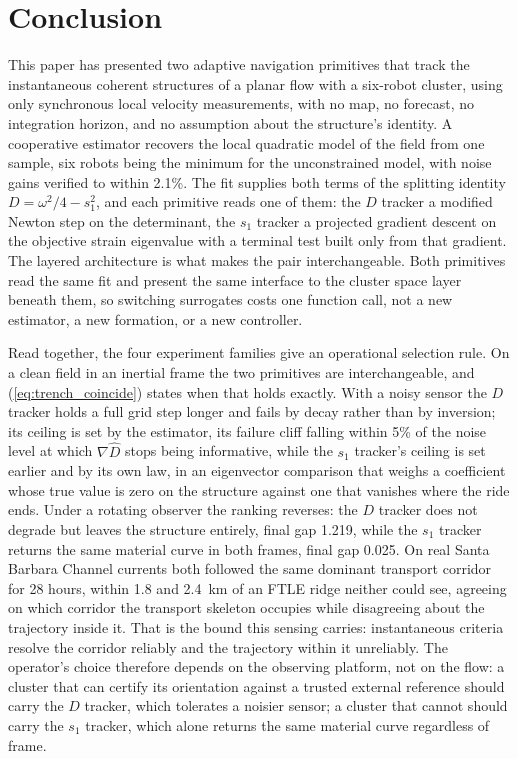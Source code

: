 \documentclass[lettersize,journal]{IEEEtran}
\begin{document}
\section{Conclusion}

This paper has presented two adaptive navigation primitives that track
the instantaneous coherent structures of a planar flow with a
six-robot cluster, using only synchronous local velocity measurements,
with no map, no forecast, no integration horizon, and no assumption
about the structure's identity. A cooperative estimator recovers the
local quadratic model of the field from one sample, six robots being
the minimum for the unconstrained model, with noise gains verified to
within 2.1\%. The fit supplies both terms of the splitting identity
$D = \omega^2/4 - s_1^2$, and each primitive reads one of them: the
$D$ tracker a modified Newton step on the determinant, the $s_1$
tracker a projected gradient descent on the objective strain
eigenvalue with a terminal test built only from that gradient. The
layered architecture is what makes the pair interchangeable. Both
primitives read the same fit and present the same interface to the
cluster space layer beneath them, so switching surrogates costs one
function call, not a new estimator, a new formation, or a new
controller.

Read together, the four experiment families give an operational
selection rule. On a clean field in an inertial frame the two
primitives are interchangeable, and (\ref{eq:trench_coincide}) states
when that holds exactly. With a noisy sensor the $D$ tracker holds a
full grid step longer and fails by decay rather than by inversion; its
ceiling is set by the estimator, its failure cliff falling within 5\%
of the noise level at which $\nabla\hat{D}$ stops being informative,
while the $s_1$ tracker's ceiling is set earlier and by its own law,
in an eigenvector comparison that weighs a coefficient whose true
value is zero on the structure against one that vanishes where the
ride ends. Under a rotating observer the ranking reverses: the $D$
tracker does not degrade but leaves the structure entirely, final gap
1.219, while the $s_1$ tracker returns the same material curve in both
frames, final gap 0.025. On real Santa Barbara Channel currents both
followed the same dominant transport corridor for 28 hours, within
1.8 and 2.4~km of an FTLE ridge neither could see, agreeing on which
corridor the transport skeleton occupies while disagreeing about the
trajectory inside it. That is the bound this sensing carries:
instantaneous criteria resolve the corridor reliably and the
trajectory within it unreliably. The operator's
choice therefore depends on the observing platform, not on the
flow: a cluster that can certify its orientation against a trusted
external reference should carry the $D$ tracker, which tolerates a
noisier sensor; a cluster that cannot should carry the $s_1$ tracker,
which alone returns the same material curve regardless of frame.
\end{document}
